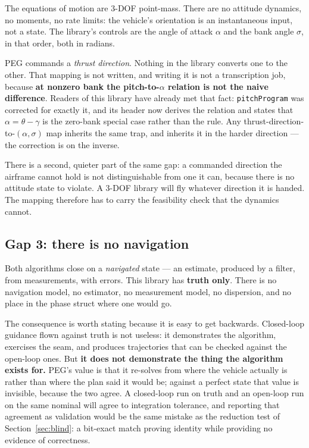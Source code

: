 \documentclass[11pt]{article}
\newcommand{\code}[1]{\texttt{#1}}
\begin{document}
The equations of motion are 3-DOF point-mass. There are no attitude dynamics,
no moments, no rate limits: the vehicle's orientation is an instantaneous
input, not a state. The library's controls are the angle of attack $\alpha$ and
the bank angle $\sigma$, in that order, both in radians.

PEG commands a \emph{thrust direction}. Nothing in the library converts one to
the other. That mapping is not written, and writing it is not a transcription
job, because \textbf{at nonzero bank the pitch-to-$\alpha$ relation is not the
naive difference}. Readers of this library have already met that fact:
\code{pitchProgram} was corrected for exactly it, and its header now derives
the relation and states that $\alpha = \theta - \gamma$ is the zero-bank
special case rather than the rule. Any thrust-direction-to-$(\alpha,\sigma)$
map inherits the same trap, and inherits it in the harder direction --- the
correction is on the inverse.

There is a second, quieter part of the same gap: a commanded direction the
airframe cannot hold is not distinguishable from one it can, because there is
no attitude state to violate. A 3-DOF library will fly whatever direction it is
handed. The mapping therefore has to carry the feasibility check that the
dynamics cannot.

\subsection{Gap 3: there is no navigation}

Both algorithms close on a \emph{navigated} state --- an estimate, produced by
a filter, from measurements, with errors. This library has \textbf{truth
only}. There is no navigation model, no estimator, no measurement model, no
dispersion, and no place in the phase struct where one would go.

The consequence is worth stating because it is easy to get backwards.
Closed-loop guidance flown against truth is not useless: it demonstrates the
algorithm, exercises the seam, and produces trajectories that can be checked
against the open-loop ones. But \textbf{it does not demonstrate the thing the
algorithm exists for.} PEG's value is that it re-solves from where the vehicle
actually is rather than where the plan said it would be; against a perfect
state that value is invisible, because the two agree. A closed-loop run on
truth and an open-loop run on the same nominal will agree to integration
tolerance, and reporting that agreement as validation would be the same
mistake as the reduction test of Section~\ref{sec:blind}: a bit-exact match
proving identity while providing no evidence of correctness.
\end{document}

